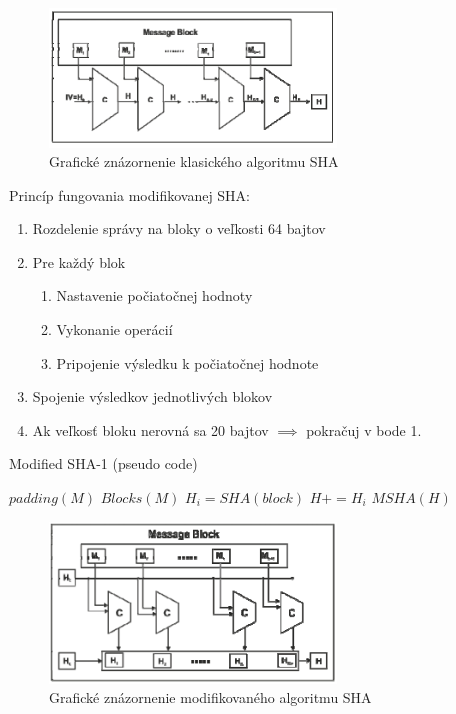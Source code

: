 \documentclass[conference]{IEEEtran}
\begin{document}
\begin{figure}[!h]
\centering
\includegraphics[width=3in]{img/SHA}
\caption{Grafické znázornenie klasického algoritmu SHA}
\end{figure}

Princíp fungovania modifikovanej SHA: 
\begin{enumerate}
	\item{Rozdelenie správy na bloky o veľkosti 64 bajtov}
	\item{Pre každý blok}
	\begin{enumerate}
		\item{Nastavenie počiatočnej hodnoty}
		\item{Vykonanie operácií}
		\item{Pripojenie výsledku k počiatočnej hodnote}
	\end{enumerate}
	\item{Spojenie výsledkov jednotlivých blokov}
	\item{Ak veľkosť bloku nerovná sa 20 bajtov $\implies$ pokračuj v bode 1.}
\end{enumerate}


\begin{algorithm}
   \caption{Modified SHA-1 (pseudo code) \cite{MSHA}}
    \begin{algorithmic}[1]

        \State ${padding(M)}$ 
        \State ${Blocks(M)}$ 
	 
     		\State ${H_i = SHA(block)}$		
     	\EndFor
   	\State ${H += H_i}$    	
   	 ${MSHA(H)}$
   	\EndIf
       \EndFunction
\end{algorithmic}
\end{algorithm}


\begin{figure}[!h]
\centering
\includegraphics[width=3in]{img/MSHA}
\caption{Grafické znázornenie modifikovaného algoritmu SHA}
\end{figure}
\end{document}

